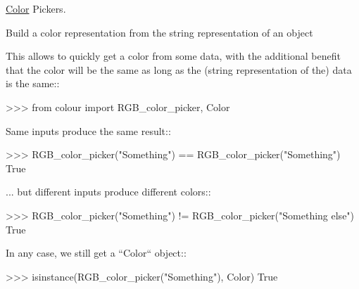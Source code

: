 \hyperlink{classcolour_1_1Color}{Color} Pickers. 

\begin{DoxyVerb}Build a color representation from the string representation of an object

This allows to quickly get a color from some data, with the
additional benefit that the color will be the same as long as the
(string representation of the) data is the same::

    >>> from colour import RGB_color_picker, Color

Same inputs produce the same result::

    >>> RGB_color_picker("Something") == RGB_color_picker("Something")
    True

... but different inputs produce different colors::

    >>> RGB_color_picker("Something") != RGB_color_picker("Something else")
    True

In any case, we still get a ``Color`` object::

    >>> isinstance(RGB_color_picker("Something"), Color)
    True\end{DoxyVerb}
 \hypertarget{namespacecolour_a5ea9eb352df7e5700013fa3a90900d7f}{}
